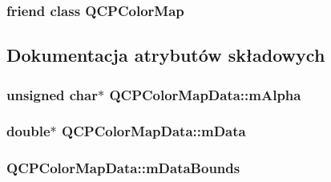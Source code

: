 \subsubsection[{\texorpdfstring{Q\+C\+P\+Color\+Map}{QCPColorMap}}]{\setlength{\rightskip}{0pt plus 5cm}friend class {\bf Q\+C\+P\+Color\+Map}\hspace{0.3cm}{\ttfamily [friend]}}\hypertarget{class_q_c_p_color_map_data_afa9d9eab63af3e6f20f882c8d7cc9f20}{}\label{class_q_c_p_color_map_data_afa9d9eab63af3e6f20f882c8d7cc9f20}


\subsection{Dokumentacja atrybutów składowych}
\subsubsection[{\texorpdfstring{m\+Alpha}{mAlpha}}]{\setlength{\rightskip}{0pt plus 5cm}unsigned char$\ast$ Q\+C\+P\+Color\+Map\+Data\+::m\+Alpha\hspace{0.3cm}{\ttfamily [protected]}}\hypertarget{class_q_c_p_color_map_data_a2146560b3a61a41186f9aa5ed9ec37a6}{}\label{class_q_c_p_color_map_data_a2146560b3a61a41186f9aa5ed9ec37a6}
\subsubsection[{\texorpdfstring{m\+Data}{mData}}]{\setlength{\rightskip}{0pt plus 5cm}double$\ast$ Q\+C\+P\+Color\+Map\+Data\+::m\+Data\hspace{0.3cm}{\ttfamily [protected]}}\hypertarget{class_q_c_p_color_map_data_ac1682862022f575191351c9825187d39}{}\label{class_q_c_p_color_map_data_ac1682862022f575191351c9825187d39}
\subsubsection[{\texorpdfstring{m\+Data\+Bounds}{mDataBounds}}]{ Q\+C\+P\+Color\+Map\+Data\+::m\+Data\+Bounds\hspace{0.3cm}{\ttfamily [protected]}}\hypertarget{class_q_c_p_color_map_data_a1798b3dcc0a27091d196bfd156dcb3f2}{}\label{class_q_c_p_color_map_data_a1798b3dcc0a27091d196bfd156dcb3f2}
